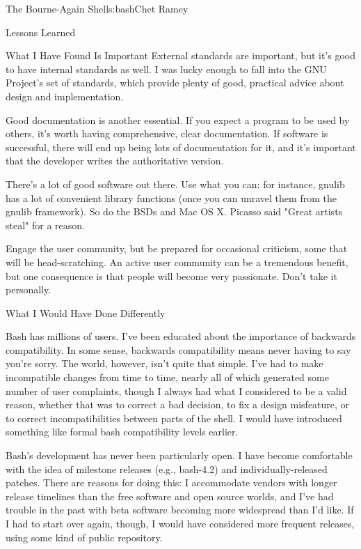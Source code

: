 \begin{aosachapter}{The Bourne-Again Shell}{s:bash}{Chet Ramey}
\begin{aosasect1}{Lessons Learned}
\begin{aosasect2}{What I Have Found Is Important}
External standards are important, but it's good to have
internal standards as well.  I was lucky enough to fall into the GNU
Project's set of standards, which provide plenty of good, practical
advice about design and implementation.

Good documentation is another essential.  If you expect a program to
be used by others, it's worth having comprehensive, clear
documentation.  If software is successful, there will end up being
lots of documentation for it, and it's important that the developer
writes the authoritative version.

There's a lot of good software out there.  Use what you can: for
instance, gnulib has a lot of convenient library functions (once you
can unravel them from the gnulib framework).  So do the BSDs and Mac
OS X\@.  Picasso said "Great artists steal" for a reason.

Engage the user community, but be prepared for occasional criticism,
some that will be head-scratching.  An active user community can be a
tremendous benefit, but one consequence is that people will become
very passionate.  Don't take it personally.

\end{aosasect2}

\begin{aosasect2}{What I Would Have Done Differently}

Bash has millions of users.  I've been educated about the importance
of backwards compatibility.  In some sense, backwards compatibility
means never having to say you're sorry.  The world, however, isn't
quite that simple.  I've had to make incompatible changes from time to
time, nearly all of which generated some number of user complaints,
though I always had what I considered to be a valid reason, whether
that was to correct a bad decision, to fix a design misfeature, or to
correct incompatibilities between parts of the shell.  I would have
introduced something like formal bash compatibility levels
earlier.

Bash's development has never been particularly open.  I have become
comfortable with the idea of milestone releases (e.g., bash-4.2) and
individually-released patches.  There are reasons for doing this: I
accommodate vendors with longer release timelines than the free
software and open source worlds, and I've had trouble in the past with
beta software becoming more widespread than I'd like.  If I had to
start over again, though, I would have considered more frequent
releases, using some kind of public repository.


\end{aosasect2}
\end{aosasect1}
\end{aosachapter}
